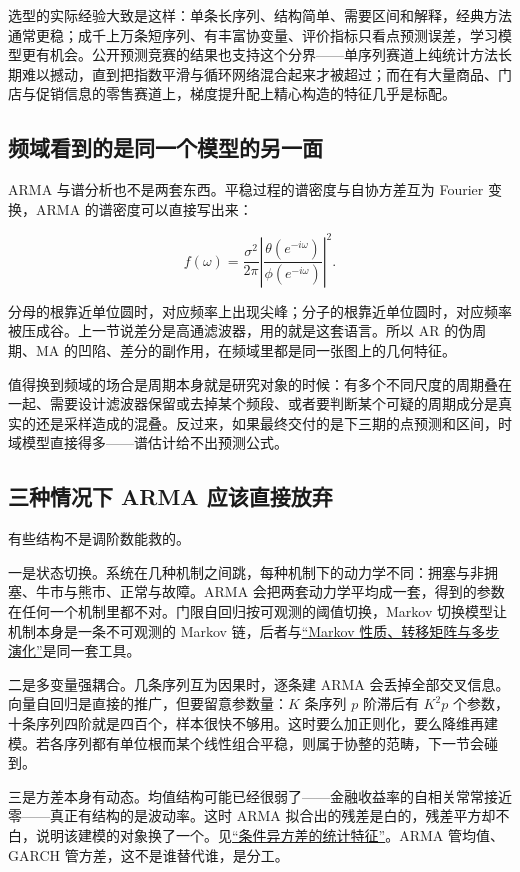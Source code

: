 选型的实际经验大致是这样：单条长序列、结构简单、需要区间和解释，经典方法通常更稳；成千上万条短序列、有丰富协变量、评价指标只看点预测误差，学习模型更有机会。公开预测竞赛的结果也支持这个分界——单序列赛道上纯统计方法长期难以撼动，直到把指数平滑与循环网络混合起来才被超过；而在有大量商品、门店与促销信息的零售赛道上，梯度提升配上精心构造的特征几乎是标配。

\subsection{频域看到的是同一个模型的另一面}

ARMA 与谱分析也不是两套东西。平稳过程的谱密度与自协方差互为 Fourier 变换，ARMA 的谱密度可以直接写出来：

\[
f(\omega)=\frac{\sigma^2}{2\pi}
\left\lvert\frac{\theta(e^{-i\omega})}{\phi(e^{-i\omega})}\right\rvert^2 .
\]

分母的根靠近单位圆时，对应频率上出现尖峰；分子的根靠近单位圆时，对应频率被压成谷。上一节说差分是高通滤波器，用的就是这套语言。所以 AR 的伪周期、MA 的凹陷、差分的副作用，在频域里都是同一张图上的几何特征。

值得换到频域的场合是周期本身就是研究对象的时候：有多个不同尺度的周期叠在一起、需要设计滤波器保留或去掉某个频段、或者要判断某个可疑的周期成分是真实的还是采样造成的混叠。反过来，如果最终交付的是下三期的点预测和区间，时域模型直接得多——谱估计给不出预测公式。

\subsection{三种情况下 ARMA 应该直接放弃}

有些结构不是调阶数能救的。

一是状态切换。系统在几种机制之间跳，每种机制下的动力学不同：拥塞与非拥塞、牛市与熊市、正常与故障。ARMA 会把两套动力学平均成一套，得到的参数在任何一个机制里都不对。门限自回归按可观测的阈值切换，Markov 切换模型让机制本身是一条不可观测的 Markov 链，后者与\hyperref[sec:06-Random-Processes/03-Markov-Chains/01]{``Markov 性质、转移矩阵与多步演化''}是同一套工具。

二是多变量强耦合。几条序列互为因果时，逐条建 ARMA 会丢掉全部交叉信息。向量自回归是直接的推广，但要留意参数量：\(K\) 条序列 \(p\) 阶滞后有 \(K^2p\) 个参数，十条序列四阶就是四百个，样本很快不够用。这时要么加正则化，要么降维再建模。若各序列都有单位根而某个线性组合平稳，则属于协整的范畴，下一节会碰到。

三是方差本身有动态。均值结构可能已经很弱了——金融收益率的自相关常常接近零——真正有结构的是波动率。这时 ARMA 拟合出的残差是白的，残差平方却不白，说明该建模的对象换了一个。见\hyperref[sec:11-Mathematical-Statistics/10-GARCH-and-Volatility/01]{``条件异方差的统计特征''}。ARMA 管均值、GARCH 管方差，这不是谁替代谁，是分工。

